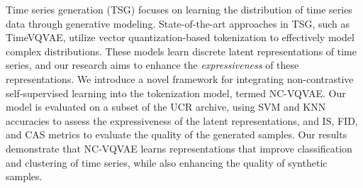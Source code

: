 \documentclass[../../thesis.tex]{subfiles}
\begin{document}
Time series generation (TSG) focuses on learning the distribution of time series data through generative modeling. State-of-the-art approaches in TSG, such as TimeVQVAE, utilize vector quantization-based tokenization to effectively model complex distributions. These models learn discrete latent representations of time series, and our research aims to enhance the \textit{expressiveness} of these representations. We introduce a novel framework for integrating non-contrastive self-supervised learning into the tokenization model, termed NC-VQVAE. Our model is evaluated on a subset of the UCR archive, using SVM and KNN accuracies to assess the expressiveness of the latent representations, and IS, FID, and CAS metrics to evaluate the quality of the generated samples. Our results demonstrate that NC-VQVAE learns representations that improve classification and clustering of time series, while also enhancing the quality of synthetic samples.
\end{document}
